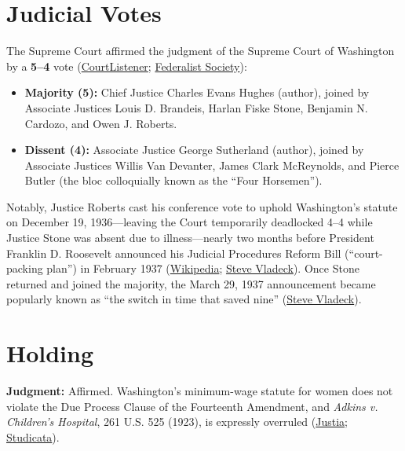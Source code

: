 \documentclass[12pt]{article}
\begin{document}
\section{Judicial Votes}

The Supreme Court affirmed the judgment of the Supreme Court of Washington by a \textbf{5--4} vote (\href{https://www.courtlistener.com/opinion/102784/west-coast-hotel-co-v-parrish/}{CourtListener}; \href{https://fedsoc.org/case/west-coast-hotel-company-v-parrish}{Federalist Society}):
\begin{itemize}
\item \textbf{Majority (5):} Chief Justice Charles Evans Hughes (author), joined by Associate Justices Louis D. Brandeis, Harlan Fiske Stone, Benjamin N. Cardozo, and Owen J. Roberts.
\item \textbf{Dissent (4):} Associate Justice George Sutherland (author), joined by Associate Justices Willis Van Devanter, James Clark McReynolds, and Pierce Butler (the bloc colloquially known as the ``Four Horsemen'').
\end{itemize}
Notably, Justice Roberts cast his conference vote to uphold Washington's statute on December 19, 1936---leaving the Court temporarily deadlocked 4--4 while Justice Stone was absent due to illness---nearly two months before President Franklin D. Roosevelt announced his Judicial Procedures Reform Bill (``court-packing plan'') in February 1937 (\href{https://en.wikipedia.org/wiki/West_Coast_Hotel_Co._v._Parrish}{Wikipedia}; \href{https://www.stevevladeck.com/p/42-the-switch-in-time-that-saved}{Steve Vladeck}). Once Stone returned and joined the majority, the March 29, 1937 announcement became popularly known as ``the switch in time that saved nine'' (\href{https://www.stevevladeck.com/p/42-the-switch-in-time-that-saved}{Steve Vladeck}).

\section{Holding}

\textbf{Judgment:} Affirmed. Washington's minimum-wage statute for women does not violate the Due Process Clause of the Fourteenth Amendment, and \textit{Adkins v. Children's Hospital}, 261 U.S. 525 (1923), is expressly overruled (\href{https://supreme.justia.com/cases/federal/us/300/379/}{Justia}; \href{https://www.studicata.com/case-briefs/case/west-coast-hotel-co-v-parrish}{Studicata}).
\end{document}

